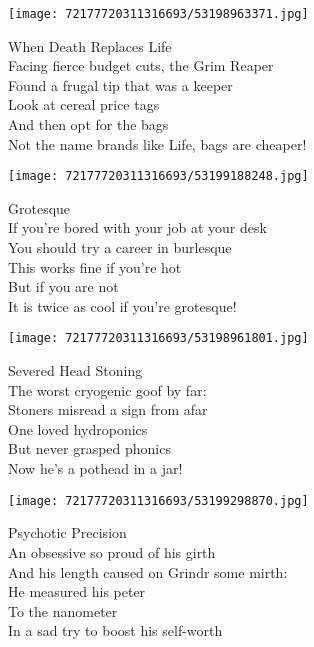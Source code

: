 \documentclass[10pt,letterpaper]{article}
\begin{document}
\begin{center}\texttt{[image: 72177720311316693/53198963371.jpg]}
\end{center}
\begin{center}
When Death Replaces Life\\
\vskip 0.2in
Facing fierce budget cuts, the Grim Reaper\\
Found a frugal tip that was a keeper\\
Look at cereal price tags\\
And then opt for the bags\\
Not the name brands like Life, bags are cheaper!\\
\end{center}
\pagebreak

\begin{center}
\texttt{[image: 72177720311316693/53199188248.jpg]}
\end{center}

\begin{center}
Grotesque\\
\vskip 0.2in
If you're bored with your job at your desk\\
You should try a career in burlesque\\
This works fine if you're hot\\
But if you are not\\
It is twice as cool if you're grotesque!\\
\end{center}
\pagebreak

\begin{center}
\texttt{[image: 72177720311316693/53198961801.jpg]}
\end{center}

\begin{center}
Severed Head Stoning\\
\vskip 0.2in
The worst cryogenic goof by far:\\
Stoners misread a sign from afar\\
One loved hydroponics\\
But never grasped phonics\\
Now he's a pothead in a jar!\\
\end{center}
\pagebreak

\begin{center}\texttt{[image: 72177720311316693/53199298870.jpg]}
\end{center}
\begin{center}
Psychotic Precision\\
\vskip 0.2in
An obsessive so proud of his girth\\
And his length caused on Grindr some mirth:\\
He measured his peter\\
To the nanometer\\
In a sad try to boost his self-worth\\
\end{center}
\pagebreak
\end{document}
